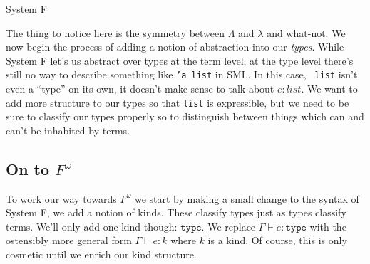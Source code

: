 \documentclass{amsart}
\newcommand{\type}{\ensuremath{\mathtt{type}}}
\begin{document}
\begin{section}{System F}

The thing to notice here is the symmetry between $\Lambda$ and
$\lambda$ and what-not. We now begin the process of adding a notion of
abstraction into our \emph{types}. While System F let's us abstract
over types at the term level, at the type level there's still no way
to describe something like {\tt 'a list} in SML. In this case, {\tt
  list} isn't even a ``type'' on its own, it doesn't make sense to
talk about $e : list$. We want to add more structure to our types so
that {\tt list} is expressible, but we need to be sure to classify our
types properly so to distinguish between things which can and can't be
inhabited by terms.

\section{On to $F^\omega$}

To work our way towards $F^\omega$ we start by making a small change
to the syntax of System F, we add a notion of kinds. These classify
types just as types classify terms. We'll only add one kind though:
\type. We replace $\Gamma \vdash e : \type$ with the ostensibly more
general form $\Gamma \vdash e : k$ where $k$ is a kind. Of course,
this is only cosmetic until we enrich our kind structure.


\end{section}
\end{document}
